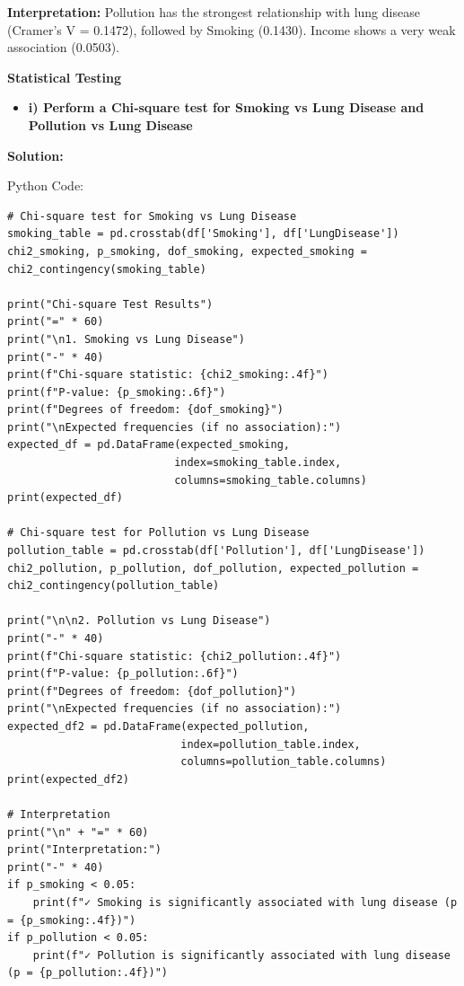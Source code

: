 \documentclass[12pt]{article}
\begin{document}
\vspace{0.4cm}

\textbf{Interpretation:}
Pollution has the strongest relationship with lung disease (Cramer's V = 0.1472), followed by Smoking (0.1430). Income shows a very weak association (0.0503).

\vspace{6cm}

{\large \textbf{Statistical Testing}}

\vspace{0.3cm}

\begin{itemize}
    \item\textbf{i) Perform a Chi‑square test for Smoking vs Lung Disease and Pollution vs Lung Disease}
\end{itemize}

{\large\textbf{Solution:}}

\vspace{0.1cm}

{\large{Python Code:}}

\vspace{0.2cm}

\begin{verbatim}
# Chi-square test for Smoking vs Lung Disease
smoking_table = pd.crosstab(df['Smoking'], df['LungDisease'])
chi2_smoking, p_smoking, dof_smoking, expected_smoking = chi2_contingency(smoking_table)

print("Chi-square Test Results")
print("=" * 60)
print("\n1. Smoking vs Lung Disease")
print("-" * 40)
print(f"Chi-square statistic: {chi2_smoking:.4f}")
print(f"P-value: {p_smoking:.6f}")
print(f"Degrees of freedom: {dof_smoking}")
print("\nExpected frequencies (if no association):")
expected_df = pd.DataFrame(expected_smoking, 
                          index=smoking_table.index, 
                          columns=smoking_table.columns)
print(expected_df)

# Chi-square test for Pollution vs Lung Disease
pollution_table = pd.crosstab(df['Pollution'], df['LungDisease'])
chi2_pollution, p_pollution, dof_pollution, expected_pollution = chi2_contingency(pollution_table)

print("\n\n2. Pollution vs Lung Disease")
print("-" * 40)
print(f"Chi-square statistic: {chi2_pollution:.4f}")
print(f"P-value: {p_pollution:.6f}")
print(f"Degrees of freedom: {dof_pollution}")
print("\nExpected frequencies (if no association):")
expected_df2 = pd.DataFrame(expected_pollution, 
                           index=pollution_table.index, 
                           columns=pollution_table.columns)
print(expected_df2)

# Interpretation
print("\n" + "=" * 60)
print("Interpretation:")
print("-" * 40)
if p_smoking < 0.05:
    print(f"✓ Smoking is significantly associated with lung disease (p = {p_smoking:.4f})")
if p_pollution < 0.05:
    print(f"✓ Pollution is significantly associated with lung disease (p = {p_pollution:.4f})")
\end{verbatim}
\end{document}
